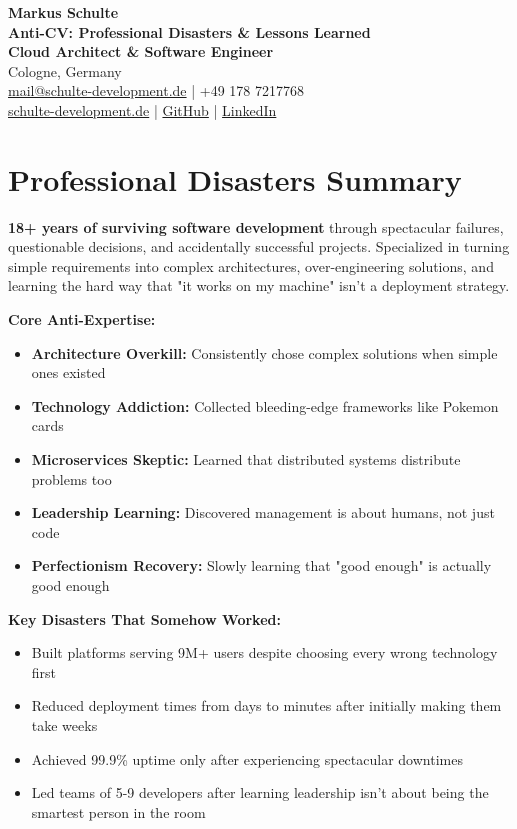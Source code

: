 \documentclass[10pt,a4paper]{article}
\begin{document}
\begin{center}
{\LARGE \textbf{Markus Schulte}}\\
\vspace{2pt}
{\large \textbf{Anti-CV: Professional Disasters \& Lessons Learned}}\\
\vspace{4pt}
\textbf{Cloud Architect \& Software Engineer}\\
Cologne, Germany\\
\href{mailto:mail@schulte-development.de}{mail@schulte-development.de} | +49 178 7217768\\
\href{https://schulte-development.de}{schulte-development.de} | \href{https://github.com/SchulteDev}{GitHub} | \href{https://linkedin.com/in/markus-schulte}{LinkedIn}
\end{center}

\vspace{6pt}

\section{Professional Disasters Summary}

\textbf{18+ years of surviving software development} through spectacular failures, questionable decisions, and accidentally successful projects. Specialized in turning simple requirements into complex architectures, over-engineering solutions, and learning the hard way that "it works on my machine" isn't a deployment strategy.

\textbf{Core Anti-Expertise:}
\begin{itemize}[leftmargin=10pt,itemsep=1pt]
\item \textbf{Architecture Overkill:} Consistently chose complex solutions when simple ones existed
\item \textbf{Technology Addiction:} Collected bleeding-edge frameworks like Pokemon cards
\item \textbf{Microservices Skeptic:} Learned that distributed systems distribute problems too
\item \textbf{Leadership Learning:} Discovered management is about humans, not just code
\item \textbf{Perfectionism Recovery:} Slowly learning that "good enough" is actually good enough
\end{itemize}

\textbf{Key Disasters That Somehow Worked:}
\begin{itemize}[leftmargin=10pt,itemsep=1pt]
\item Built platforms serving 9M+ users despite choosing every wrong technology first
\item Reduced deployment times from days to minutes after initially making them take weeks
\item Achieved 99.9\% uptime only after experiencing spectacular downtimes
\item Led teams of 5-9 developers after learning leadership isn't about being the smartest person in the room
\end{itemize}
\end{document}
